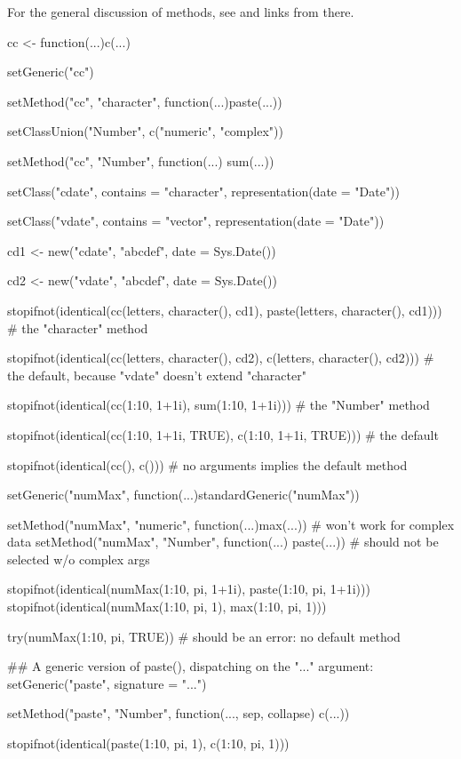 %
\begin{SeeAlso}\relax
For the general discussion of methods, see   and links
from there.
\end{SeeAlso}
%
\begin{Examples}
\begin{ExampleCode}
cc <- function(...)c(...)

setGeneric("cc")

setMethod("cc", "character", function(...)paste(...))

setClassUnion("Number", c("numeric", "complex"))

setMethod("cc", "Number", function(...) sum(...))

setClass("cdate", contains = "character", representation(date = "Date"))

setClass("vdate", contains = "vector", representation(date = "Date"))

cd1 <- new("cdate", "abcdef", date = Sys.Date())

cd2 <- new("vdate", "abcdef", date = Sys.Date())

stopifnot(identical(cc(letters, character(), cd1), paste(letters, character(), cd1))) # the "character" method

stopifnot(identical(cc(letters, character(), cd2), c(letters, character(), cd2))) # the default, because "vdate" doesn't extend "character"

stopifnot(identical(cc(1:10, 1+1i), sum(1:10, 1+1i))) # the "Number" method

stopifnot(identical(cc(1:10, 1+1i, TRUE), c(1:10, 1+1i, TRUE))) # the default

stopifnot(identical(cc(), c())) # no arguments implies the default method

setGeneric("numMax", function(...)standardGeneric("numMax"))

setMethod("numMax", "numeric", function(...)max(...)) # won't work for complex data
setMethod("numMax", "Number", function(...) paste(...)) # should not be selected w/o complex args

stopifnot(identical(numMax(1:10, pi, 1+1i), paste(1:10, pi, 1+1i)))
stopifnot(identical(numMax(1:10, pi, 1), max(1:10, pi, 1)))

try(numMax(1:10, pi, TRUE)) # should be an error:  no default method

## A generic version of paste(), dispatching on the "..." argument:
setGeneric("paste", signature = "...")

setMethod("paste", "Number", function(..., sep, collapse) c(...))

stopifnot(identical(paste(1:10, pi, 1), c(1:10, pi, 1)))


\end{ExampleCode}
\end{Examples}
